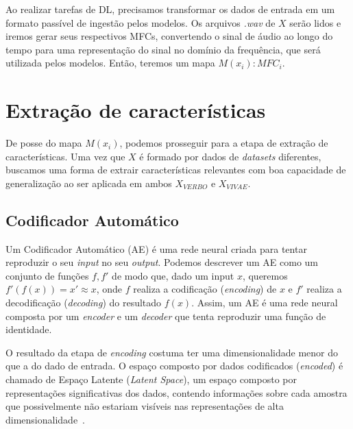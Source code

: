 Ao realizar tarefas de \acrshort{DL}, precisamos transformar os dados de entrada em um formato passível de ingestão pelos modelos. Os arquivos \textit{.wav} de $X$ serão lidos e iremos gerar seus respectivos \acrshort{MFC}s, convertendo o sinal de áudio ao longo do tempo para uma representação do sinal no domínio da frequência, que será utilizada pelos modelos. Então, teremos um mapa $M(x_i): MFC_i$.


\section{Extração de características}

De posse do mapa $M(x_i)$, podemos prosseguir para a etapa de extração de características. Uma vez que $X$ é formado por dados de \textit{datasets} diferentes, buscamos uma forma de extrair características relevantes com boa capacidade de generalização ao ser aplicada em ambos $X_{VERBO}$ e $X_{VIVAE}$.

\subsection{Codificador Automático}

Um Codificador Automático (\acrshort{AE}) é uma rede neural criada para tentar reproduzir o seu \textit{input} no seu \textit{output}. Podemos descrever um \acrshort{AE} como um conjunto de funções $f, f'$ de modo que, dado um input $x$, queremos $f'(f(x)) = x' \approx x$, onde $f$ realiza a codificação (\textit{encoding}) de $x$ e $f'$ realiza a decodificação (\textit{decoding}) do resultado $f(x)$. Assim, um \acrshort{AE} é uma rede neural composta por um \textit{encoder} e um \textit{decoder} que tenta reproduzir uma função de identidade.


O resultado da etapa de \textit{encoding} costuma ter uma dimensionalidade menor do que a do dado de entrada. O espaço composto por dados codificados (\textit{encoded}) é chamado de Espaço Latente (\textit{Latent Space}), um espaço composto por representações significativas dos dados, contendo informações sobre cada amostra que possivelmente não estariam visíveis nas representações de alta dimensionalidade~\cite{60}.

